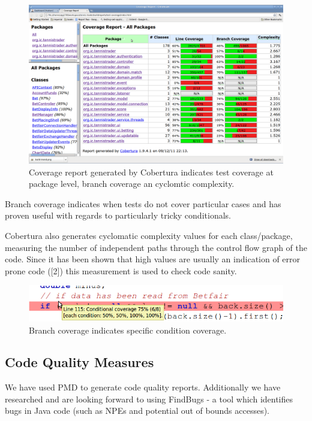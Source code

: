 \documentclass[10pt]{report}
\begin{document}
\begin{figure}[ht]
\centering
\includegraphics[bb=0 0 1680 1050, scale = 0.2]{coverage.png}
\caption{Coverage report generated by Cobertura indicates test coverage at package level, branch coverage an cyclomtic complexity.}
\end{figure}

Branch coverage indicates when tests do not cover particular cases and has proven useful with regards to particularly tricky conditionals.

Cobertura also generates cyclomatic complexity values for each class/package, measuring the number of independent paths through the control flow graph of the code. Since it has been shown that high values are usually an indication of error prone code ([2]) this measurement is used to check code sanity.

\begin{figure}[ht]
\centering
\includegraphics[bb=0 0 700 100, scale = 0.49]{branch.png}
\caption{Branch coverage indicates specific condition coverage.}
\end{figure}

\subsection{Code Quality Measures}
\label{sec-quality}
We have used PMD to generate code quality reports. Additionally we have researched and are looking forward to using FindBugs - a tool which identifies bugs in Java code (such as NPEs and potential out of bounds accesses).
\end{document}
